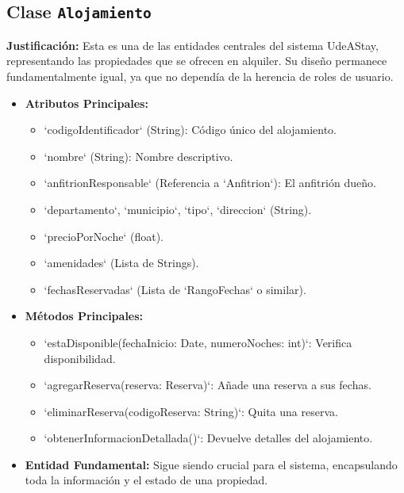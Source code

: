 \documentclass[journal]{IEEEtran}
\begin{document}
\subsection{Clase \texttt{Alojamiento}}
\textbf{Justificación:} Esta es una de las entidades centrales del sistema UdeAStay, representando las propiedades que se ofrecen en alquiler. Su diseño permanece fundamentalmente igual, ya que no dependía de la herencia de roles de usuario.
\begin{itemize}
    \item \textbf{Atributos Principales:}
        \begin{itemize}
            \item `codigoIdentificador` (String): Código único del alojamiento.
            \item `nombre` (String): Nombre descriptivo.
            \item `anfitrionResponsable` (Referencia a `Anfitrion`): El anfitrión dueño.
            \item `departamento`, `municipio`, `tipo`, `direccion` (String).
            \item `precioPorNoche` (float).
            \item `amenidades` (Lista de Strings).
            \item `fechasReservadas` (Lista de `RangoFechas` o similar).
        \end{itemize}
    \item \textbf{Métodos Principales:}
        \begin{itemize}
            \item `estaDisponible(fechaInicio: Date, numeroNoches: int)`: Verifica disponibilidad.
            \item `agregarReserva(reserva: Reserva)`: Añade una reserva a sus fechas.
            \item `eliminarReserva(codigoReserva: String)`: Quita una reserva.
            \item `obtenerInformacionDetallada()`: Devuelve detalles del alojamiento.
        \end{itemize}
    \item \textbf{Entidad Fundamental:} Sigue siendo crucial para el sistema, encapsulando toda la información y el estado de una propiedad.
\end{itemize}
\end{document}

